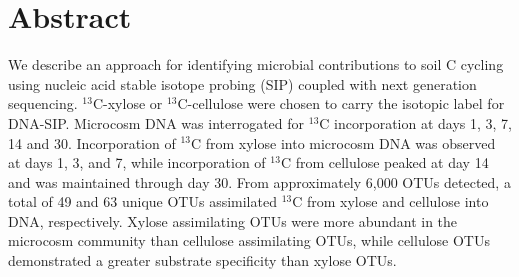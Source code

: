 \section{Abstract}
We describe an approach for identifying microbial contributions to soil
C cycling using nucleic acid stable isotope probing (SIP) coupled with next
generation sequencing. $^{13}$C-xylose or $^{13}$C-cellulose were chosen to
carry the isotopic label for DNA-SIP. Microcosm
DNA was interrogated for $^{13}$C incorporation at days 1, 3, 7, 14 and 
30. Incorporation of $^{13}$C from xylose into microcosm DNA
was observed at days 1, 3, and 7, while incorporation of $^{13}$C from
cellulose peaked at day 14 and was maintained through day 30. From
approximately 6,000 OTUs detected, a total of 49 and 63 unique OTUs assimilated
$^{13}$C from xylose and cellulose into DNA, respectively. Xylose assimilating
OTUs were more abundant in the microcosm community than cellulose assimilating
OTUs, while cellulose OTUs demonstrated a greater substrate specificity than
xylose OTUs.
